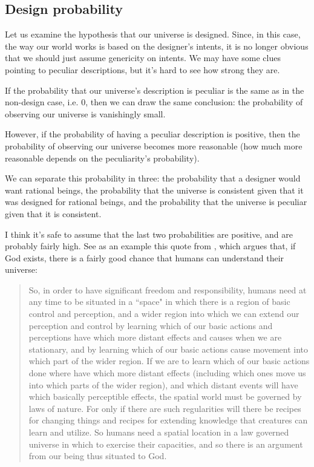 \documentclass[a4paper
,draft
]{article}
\newcommand{\ghilimele}[1]{``#1"}
\begin{document}
\subsection{Design probability}
\label{sec:design-probability}

Let us examine the hypothesis that our universe is designed.
Since, in this case, the way our world works is based on the designer's intents,
it is no longer obvious that we should just assume genericity on intents.
We may have some clues pointing to peculiar descriptions, but it's hard to see
how strong they are.

If the probability that our universe's description is peculiar is the same as
in the non-design case, i.e. $0$, then we can draw the same conclusion: the
probability of observing our universe is vanishingly small.

However, if the probability of having a peculiar description is positive, then
the probability of observing our universe becomes more reasonable (how much
more reasonable depends on the peculiarity's probability).

We can separate this probability in three: the probability that a designer
would want rational beings, the probability that the universe is consistent
given that it was designed for rational beings, and the probability that the
universe is peculiar given that it is consistent.

I think it's safe to assume that the last two probabilities are positive,
and are probably fairly high. See as an example this quote from
\textcite{Swinburne2003}, which argues that, if God exists,
there is a fairly good chance that humans can understand their universe:

\begin{quote}
  So, in order to have significant freedom and responsibility, humans need
  at any time to be situated in a \ghilimele{space} in which there is a
  region of basic control and perception, and a wider region into which
  we can extend our perception and control by learning which of our
  basic actions and perceptions have which more distant effects and causes
  when we are stationary, and by learning which of our basic actions cause
  movement into which part of the wider region.
  If we are to learn which of our basic actions done where have which
  more distant effects (including which ones move us into which parts
  of the wider region), and which distant events will have which basically
  perceptible effects, the spatial world must be governed by laws of nature.
  For only if there are such regularities will there be recipes for changing
  things and recipes for extending knowledge that creatures can learn and
  utilize.
  So humans need a spatial location in a law governed universe in which to
  exercise their capacities, and so there is an argument from our being thus
  situated to God.
\end{quote}
\end{document}
